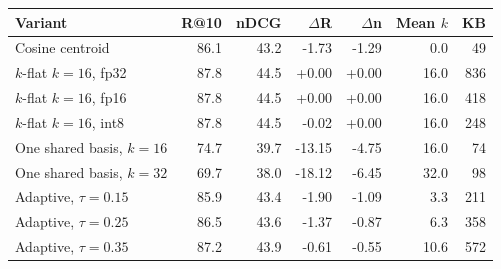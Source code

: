 \begin{center}
\label{tab:cheap}
\small
\setlength{\tabcolsep}{3.5pt}
\begin{tabular}{lrrrrrr}
\toprule
Variant & R@10 & nDCG & $\Delta$R & $\Delta$n & Mean $k$ & KB \\
\midrule
Cosine centroid & 86.1 & 43.2 & -1.73 & -1.29 & 0.0 & 49 \\
$k$-flat $k{=}16$, fp32 & 87.8 & 44.5 & +0.00 & +0.00 & 16.0 & 836 \\
$k$-flat $k{=}16$, fp16 & 87.8 & 44.5 & +0.00 & +0.00 & 16.0 & 418 \\
$k$-flat $k{=}16$, int8 & 87.8 & 44.5 & -0.02 & +0.00 & 16.0 & 248 \\
One shared basis, $k{=}16$ & 74.7 & 39.7 & -13.15 & -4.75 & 16.0 & 74 \\
One shared basis, $k{=}32$ & 69.7 & 38.0 & -18.12 & -6.45 & 32.0 & 98 \\
Adaptive, $\tau{=}0.15$ & 85.9 & 43.4 & -1.90 & -1.09 & 3.3 & 211 \\
Adaptive, $\tau{=}0.25$ & 86.5 & 43.6 & -1.37 & -0.87 & 6.3 & 358 \\
Adaptive, $\tau{=}0.35$ & 87.2 & 43.9 & -0.61 & -0.55 & 10.6 & 572 \\
\bottomrule
\end{tabular}
\end{center}
